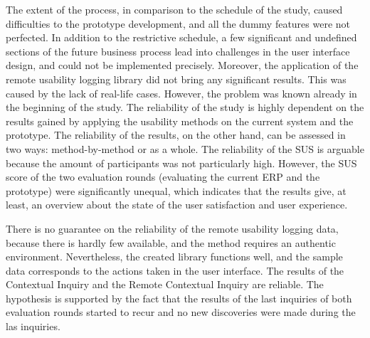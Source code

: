 \documentclass[12pt,a4paper,oneside,pdftex]{report}
\begin{document}
The extent of the process, in comparison to the schedule of the study, caused difficulties to the prototype development, and all the dummy features were not perfected. In addition to the restrictive schedule, a few significant and undefined sections of the future business process lead into challenges in the user interface design, and could not be implemented precisely. Moreover, the application of the remote usability logging library did not bring any significant results. This was caused by the lack of real-life cases. However, the problem was known already in the beginning of the study.
The reliability of the study is highly dependent on the results gained by applying the usability methods on the current system and the prototype. The reliability of the results, on the other hand, can be assessed in two ways: method-by-method or as a whole. The reliability of the SUS is arguable because the amount of participants was not particularly high. However, the SUS score of the two evaluation rounds (evaluating the current ERP and the prototype) were significantly unequal, which indicates that the results give, at least, an overview about the state of the user satisfaction and user experience. 

There is no guarantee on the reliability of the remote usability logging data, because there is hardly few available, and the method requires an authentic environment. Nevertheless, the created library functions well, and the sample data corresponds to the actions taken in the user interface. The results of the Contextual Inquiry and the Remote Contextual Inquiry are reliable. The hypothesis is supported by the fact that the results of the last inquiries of both evaluation rounds started to recur and no new discoveries were made during the las inquiries. 
\end{document}
